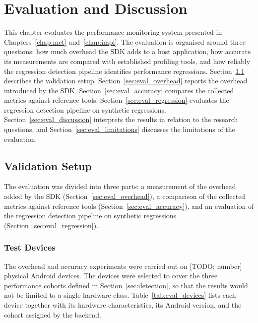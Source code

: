 \chapter{Evaluation and Discussion}
\label{chap:eval}

This chapter evaluates the performance monitoring system presented in Chapters~\ref{chap:met} and~\ref{chap:impl}. The evaluation is organised around three questions: how much overhead the SDK adds to a host application, how accurate its measurements are compared with established profiling tools, and how reliably the regression detection pipeline identifies performance regressions. Section~\ref{sec:eval_setup} describes the validation setup. Section~\ref{sec:eval_overhead} reports the overhead introduced by the SDK. Section~\ref{sec:eval_accuracy} compares the collected metrics against reference tools. Section~\ref{sec:eval_regression} evaluates the regression detection pipeline on synthetic regressions. Section~\ref{sec:eval_discussion} interprets the results in relation to the research questions, and Section~\ref{sec:eval_limitations} discusses the limitations of the evaluation.

\section{Validation Setup}
\label{sec:eval_setup}

The evaluation was divided into three parts: a measurement of the overhead added by the SDK (Section~\ref{sec:eval_overhead}), a comparison of the collected metrics against reference tools (Section~\ref{sec:eval_accuracy}), and an evaluation of the regression detection pipeline on synthetic regressions (Section~\ref{sec:eval_regression}).

\subsection{Test Devices}

The overhead and accuracy experiments were carried out on [TODO: number] physical Android devices. The devices were selected to cover the three performance cohorts defined in Section~\ref{sec:detection}, so that the results would not be limited to a single hardware class. Table~\ref{tab:eval_devices} lists each device together with its hardware characteristics, its Android version, and the cohort assigned by the backend.

